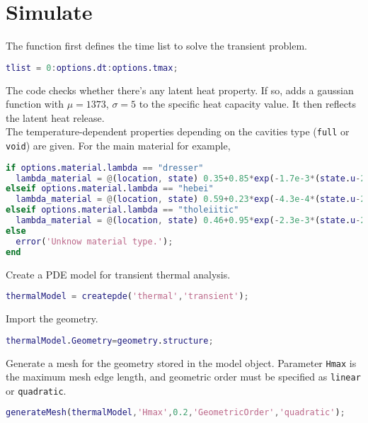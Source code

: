 \section{Simulate} 

The function first defines the time list to solve the transient problem. 

\begin{lstlisting}[language=Matlab]
tlist = 0:options.dt:options.tmax;
\end{lstlisting}

The code checks whether there's any latent heat property. If so, adds a gaussian function with $\mu = 1373$, $\sigma = 5$ to the specific heat capacity value. It then reflects the latent heat release. \\

The temperature-dependent properties depending on the cavities type (\texttt{full} or \texttt{void}) are given. For the main material for example,

\begin{lstlisting}[language=Matlab]
if options.material.lambda == "dresser"
  lambda_material = @(location, state) 0.35+0.85*exp(-1.7e-3*(state.u-273)); 
elseif options.material.lambda == "hebei"
  lambda_material = @(location, state) 0.59+0.23*exp(-4.3e-4*(state.u-273)); 
elseif options.material.lambda == "tholeiitic"
  lambda_material = @(location, state) 0.46+0.95*exp(-2.3e-3*(state.u-273)); 
else 
  error('Unknow material type.');
end
\end{lstlisting}

\medskip
Create a PDE model for transient thermal analysis.

\begin{lstlisting}[language=Matlab]
thermalModel = createpde('thermal','transient');
\end{lstlisting}

\medskip
Import the geometry. 

\begin{lstlisting}[language=Matlab]
thermalModel.Geometry=geometry.structure;
\end{lstlisting}

\medskip
Generate a mesh for the geometry stored in the model object. Parameter \texttt{Hmax} is the maximum mesh edge length, and geometric order must be specified as \texttt{linear} or \texttt{quadratic}.

\begin{lstlisting}[language=Matlab]
generateMesh(thermalModel,'Hmax',0.2,'GeometricOrder','quadratic');\end{lstlisting}

